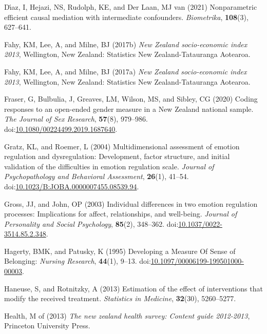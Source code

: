 \documentclass[
  single column]{article}
\newlength{\cslhangindent}
\newenvironment{CSLReferences}[2] %
 {\begin{list}{}{%
  \setlength{\itemindent}{0pt}
  \setlength{\leftmargin}{0pt}
  \setlength{\parsep}{0pt}
  \ifodd #1
   \setlength{\leftmargin}{\cslhangindent}
   \setlength{\itemindent}{-1\cslhangindent}
  \fi
  \setlength{\itemsep}{#2\baselineskip}}}
 {\end{list}}
\begin{document}
\begin{CSLReferences}{1}{0}
Dı́az, I, Hejazi, NS, Rudolph, KE, and Der Laan, MJ van (2021)
Nonparametric efficient causal mediation with intermediate confounders.
\emph{Biometrika}, \textbf{108}(3), 627--641.

Fahy, KM, Lee, A, and Milne, BJ (2017b) \emph{New Zealand socio-economic
index 2013}, Wellington, New Zealand: Statistics New Zealand-Tatauranga
Aotearoa.

Fahy, KM, Lee, A, and Milne, BJ (2017a) \emph{New Zealand socio-economic
index 2013}, Wellington, New Zealand: Statistics New Zealand-Tatauranga
Aotearoa.

Fraser, G, Bulbulia, J, Greaves, LM, Wilson, MS, and Sibley, CG (2020)
Coding responses to an open-ended gender measure in a {N}ew {Z}ealand
national sample. \emph{The Journal of Sex Research}, \textbf{57}(8),
979--986.
doi:\href{https://doi.org/10.1080/00224499.2019.1687640}{10.1080/00224499.2019.1687640}.

Gratz, KL, and Roemer, L (2004) Multidimensional assessment of emotion
regulation and dysregulation: Development, factor structure, and initial
validation of the difficulties in emotion regulation scale.
\emph{Journal of Psychopathology and Behavioral Assessment},
\textbf{26}(1), 41--54.
doi:\href{https://doi.org/10.1023/B:JOBA.0000007455.08539.94}{10.1023/B:JOBA.0000007455.08539.94}.

Gross, JJ, and John, OP (2003) Individual differences in two emotion
regulation processes: Implications for affect, relationships, and
well-being. \emph{Journal of Personality and Social Psychology},
\textbf{85}(2), 348--362.
doi:\href{https://doi.org/10.1037/0022-3514.85.2.348}{10.1037/0022-3514.85.2.348}.

Hagerty, BMK, and Patusky, K (1995) Developing a Measure Of Sense of
Belonging: \emph{Nursing Research}, \textbf{44}(1), 9--13.
doi:\href{https://doi.org/10.1097/00006199-199501000-00003}{10.1097/00006199-199501000-00003}.

Haneuse, S, and Rotnitzky, A (2013) Estimation of the effect of
interventions that modify the received treatment. \emph{Statistics in
Medicine}, \textbf{32}(30), 5260--5277.

Health, M of (2013) \emph{The new zealand health survey: Content guide
2012-2013}, Princeton University Press.


\end{CSLReferences}
\end{document}
